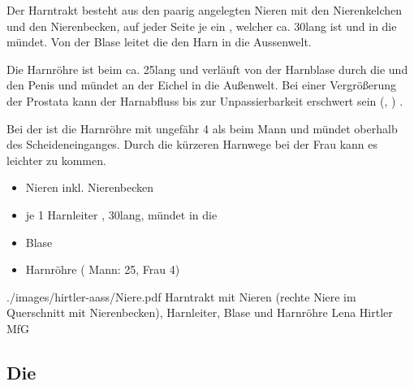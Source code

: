 \TextSlidePicture
{\TxBeschreibung}%
{%
Der Harntrakt besteht aus den paarig angelegten
Nieren mit den Nierenkelchen und den Nierenbecken, auf jeder
Seite je ein   , welcher ca.
30\CM* lang ist und in die
 mündet. Von der Blase leitet die
  den Harn in die Aussenwelt.

Die Harnröhre ist beim  ca. 25\CM* lang und
verläuft von der Harnblase durch die 
 und den Penis und mündet an der
Eichel in die Außenwelt. 
%
Bei einer Vergrößerung der Prostata
kann der Harnabfluss 
bis zur Unpassierbarkeit erschwert sein
(, )%
.

Bei der  ist die Harnröhre mit 
ungefähr 4\CM*
{} 
als beim Mann 
und mündet oberhalb des Scheideneinganges. 
%
Durch die kürzeren Harnwege bei der Frau 
kann es leichter zu  kommen.
}%
{
\begin{itemize}
    \item Nieren inkl. Nierenbecken
    \item {}je 1 Harnleiter 
    , 30\CM* lang, mündet  in die 
    \item {}Blase 
    \item Harnröhre  ( Mann: 25\CM*, Frau
    4\CM*)
\end{itemize}}%
{./images/hirtler-aass/Niere.pdf}%
{Harntrakt}%
{mit Nieren (rechte Niere im Querschnitt mit Nierenbecken),
Harnleiter, Blase und Harnröhre\label{fig:harntrakt}}%
{Lena Hirtler}%
{MfG}%



\subsection{Die }


